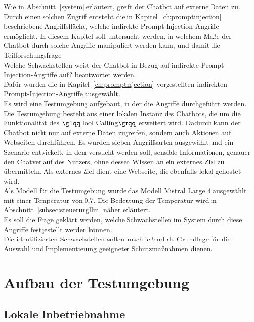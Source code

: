 Wie in Abschnitt~\ref{system} erläutert, greift der Chatbot auf externe Daten zu. Durch einen solchen Zugriff entsteht die in Kapitel~\ref{ch:promptinjection} 
beschriebene Angriffsfläche, welche indirekte Prompt-Injection-Angriffe ermöglicht. In diesem Kapitel soll untersucht werden, in welchem Maße der Chatbot durch solche 
Angriffe manipuliert werden kann, und damit die Teilforschungsfrage \\
\glqq Welche Schwachstellen weist der Chatbot in Bezug auf indirekte Prompt-Injection-Angriffe auf?\grqq{} beantwortet
werden. \\
Dafür wurden die in Kapitel~\ref{ch:promptinjection} vorgestellten indirekten Prompt-Injection-Angriffe ausgewählt. \\
Es wird eine Testumgebung aufgebaut, in der die Angriffe durchgeführt werden. Die Testumgebung besteht aus einer lokalen Instanz des Chatbots,
die um die Funktionalität des  $\glqq$Tool Calling$\grqq$ erweitert wird. Dadurch kann der Chatbot nicht nur auf externe Daten zugreifen, sondern auch
Aktionen auf Webseiten durchführen. Es wurden sieben Angriffsarten ausgewählt und ein Szenario entwickelt, in dem versucht werden soll, sensible Informationen,
genauer den Chatverlauf des Nutzers, ohne dessen Wissen an ein externes Ziel zu übermitteln. Als externes Ziel dient eine Webseite,
die ebenfalls lokal gehostet wird. \\
Als Modell für die Testumgebung wurde das Modell Mistral Large 4 ausgewählt mit einer Temperatur von 0,7. Die Bedeutung der Temperatur wird in 
Abschnitt~\ref{subsec:steuerungllm} näher erläutert. \\
Es soll die Frage geklärt werden, welche Schwachstellen im System durch diese Angriffe festgestellt werden können. \\
Die identifizierten Schwachstellen sollen anschließend als Grundlage für die Auswahl und Implementierung geeigneter Schutzmaßnahmen dienen.

\section{Aufbau der Testumgebung}\label{sec:einrichtung}

\subsection{Lokale Inbetriebnahme}

